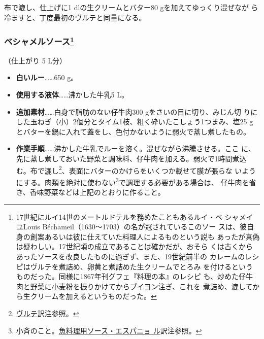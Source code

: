 \begin{recette}
布で漉し、仕上げに1 dlの生クリームとバター80 gを加えてゆっくり混ぜなが
ら冷ますと、丁度最初のヴルテと同量になる。

\maeaki

\hypertarget{sauce-bechamel}{%
\subsubsection[ベシャメルソース]{\texorpdfstring{ベシャメルソース\footnote{17世紀にルイ14世のメートルドテルを務めたこともあるルイ・ベ
  シャメイユLouis Béchameil（1630〜1703）の名が冠されているこのソー
  スは、彼自身の創案あるいは彼に仕えていた料理人によるものという説も
  あったが真偽は疑わしい。17世紀頃の成立であることは確かだが、おそら
  くは古くからあったソースを改良したものに過ぎず、また、19世紀前半の
  カレームのレシピはヴルテを煮詰め、卵黄と煮詰めた生クリームでとろみ
  を付けるというものだった。同様に1867年刊グフェ『料理の本』のレシピ
  も、炒めた仔牛肉と野菜に小麦粉を振りかけてからブイヨン注ぎ、これを
  煮詰め、漉してから生クリームを加えるというものだった。}}{ベシャメルソース}}\label{sauce-bechamel}}



（仕上がり 5 L分）

\begin{itemize}
\item
  \textbf{白いルー}\ldots{}\ldots{}650 g。
\item
  \textbf{使用する液体}\ldots{}\ldots{}沸かした牛乳5 L。
\item
  \textbf{追加素材}\ldots{}\ldots{}白身で脂肪のない仔牛肉300
  gをさいの目に切り、みじん切
  りにした玉ねぎ（小）2個分とタイム1枝、粗く砕いたこしょう1つまみ、塩25
  g とバターを鍋に入れて蓋をし、色付かないように弱火で蒸し煮したもの。
\item
  \textbf{作業手順}\ldots{}\ldots{}沸かした牛乳でルーを溶く。混ぜながら沸騰させる。ここ
  に、先に蒸し煮しておいた野菜と調味料、仔牛肉を加える。弱火で1時間煮込
  む。布で漉し\footnote{\protect\hyperlink{veloute}{ヴルテ}訳注参照。}、表面にバターのかけらをいくつか載せて膜が張らな
  いようにする。肉類を絶対に使わない\footnote{小斉のこと。\protect\hyperlink{sauce-espagnole-maigre}{魚料理用ソース・エスパニョ
    ル}訳注参照。}で調理する必要がある場合は、
  仔牛肉を省き、香味野菜などは上記のとおりに作ること。
\end{itemize}


\end{recette}
